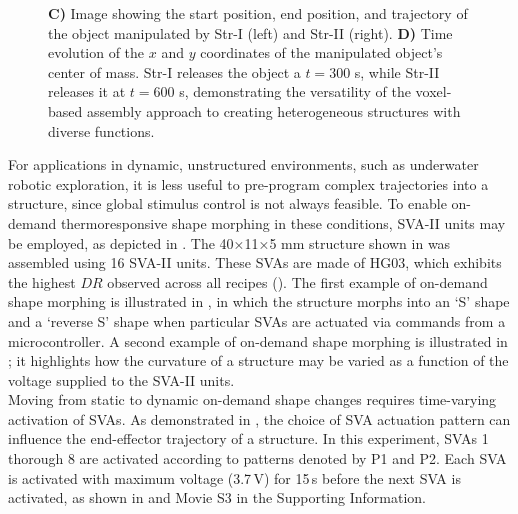 \begin{figure}[t]
{%
\textbf{C)} Image showing the start position,  end position, and  trajectory of the  object manipulated by Str-I (left) and Str-II (right). \textbf{D)} Time evolution of the $x$ and $y$ coordinates of the manipulated object's center of mass.  Str-I releases the object   a $t=300$ s, while  Str-II releases it at $t= 600$ s, demonstrating the versatility of the voxel-based assembly approach to creating heterogeneous structures with diverse functions.}
\label{fig:3}
\end{figure}

For applications in dynamic, unstructured environments, such as underwater robotic exploration, it is less useful to pre-program complex trajectories into a structure, since global stimulus control is not always feasible. To enable on-demand thermoresponsive shape morphing in these conditions, SVA-II units may be employed, as depicted in . The 40×11×5 mm structure shown in  was assembled using 16 SVA-II units. These SVAs are made of HG03, which exhibits the highest $DR$ observed across all recipes (). The first example of on-demand shape morphing is illustrated in , in which the structure morphs into an `S' shape and a `reverse S' shape when particular SVAs are actuated via commands from a microcontroller. %
A second example of on-demand shape morphing is illustrated in ; it highlights how the curvature of a structure may be varied as a function of the voltage supplied to the SVA-II units.\\

Moving from static to dynamic on-demand shape changes requires time-varying activation of SVAs.
As demonstrated in , the choice of SVA actuation pattern can influence the end-effector trajectory of a structure. In this experiment, SVAs 1 thorough 8 are activated according to patterns denoted by P1 and P2.
Each SVA is activated with maximum voltage (3.7\,V) for 15\,s before the next SVA is activated, as shown in  
and Movie S3 in the Supporting Information.\\  



